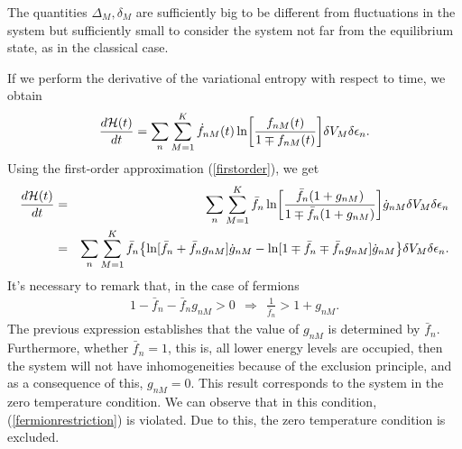   The quantities $\Delta_M,\delta_M$ are sufficiently big to be different from
fluctuations in the system but sufficiently small to consider the system not
far from the equilibrium state, as in the classical case. 

If we perform the derivative of the variational entropy with respect to time,
we obtain
%
\begin{equation}
   \frac{d \mathcal{H} (t)}{dt}= \sum_n \sum_{M=1}^{K} \dot{f}_{nM}(t)\ln \left[ \frac{f_{nM}(t)}{1\mp f_{nM}(t)} \right] \de V_M \delta \epsilon_n.\label{deltaH}
\end{equation}
%
Using the first-order approximation (\ref{firstorder}), we get
%
\begin{eqnarray}
    \frac{d\mathcal{H} (t)}{dt}&=&\sum_n \sum_{M=1}^{K} \bar{f}_{n}\ln \left[ \frac{\bar{f}_{n}(1+g_{nM})}{1\mp \bar{f}_{n} (1+ g_{nM})} \right]\dot{g}_{nM} \de V_M\delta \epsilon_n \nonumber \\
    &=&\sum_n \sum_{M=1}^{K} \bar{f}_n \left \{ \ln [\bar{f}_n+\bar{f}_n g_{nM}]\dot{g}_{nM}-\ln [1\mp\bar{f}_n\mp\bar{f}_n g_{nM}]\dot{g}_{nM}  \right \}\de V_M \delta \epsilon_n.\nonumber \\
    \label{cambioH1}
\end{eqnarray}
%
It's necessary to remark that, in the case of fermions
%
\begin{eqnarray}
   1-\bar f_n -\bar f_n g_{nM}>0 \ \ \Rightarrow \ \ \frac{1}{\bar f_n}>1+g_{nM}. \label{fermionrestriction}
\end{eqnarray}
%
The previous expression establishes that the value of $g_{nM}$ is determined by
$\bar f_n$. Furthermore, whether $\bar f_{n}=1$, this is, all lower energy
levels are occupied, then the system will not have inhomogeneities because of
the exclusion principle, and as a consequence of this,  $g_{nM}=0$. This result
corresponds to the system in the zero temperature condition. We can observe
that in this condition, (\ref{fermionrestriction}) is violated. Due to this,
the zero temperature condition is excluded.


